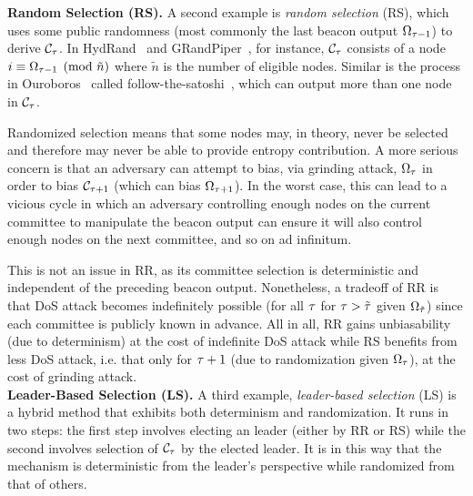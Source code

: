\noindent\textbf{Random Selection (RS).} A second example is \textit{random selection} (RS), which uses some public randomness (most commonly the last beacon output $\Omega_{\tau - 1}$) to derive $\mathcal{C}_\tau$.
In HydRand~\cite{schindler2020hydrand} and GRandPiper~\cite{bhat2020randpiper}, for instance, $\mathcal{C}_\tau$ consists of a node $i \equiv \Omega_{\tau - 1} \pmod{\tilde{n}}$ where $\tilde{n}$ is the number of eligible nodes. Similar is the process in Ouroboros~\cite{kiayias2017ouroboros} called follow-the-satoshi~\cite{bentov2014proof,kiayias2017ouroboros}, which can output more than one node in $\mathcal{C}_\tau$.

Randomized selection means that some nodes may, in theory, never be selected and therefore may never be able to provide entropy contribution. A more serious concern is that an adversary can attempt to bias, via grinding attack, $\Omega_\tau$ in order to bias $\mathcal{C}_{\tau + 1}$ (which can bias $\Omega_{\tau + 1}$). In the worst case, this can lead to a vicious cycle in which an adversary controlling enough nodes on the current committee to manipulate the beacon output can ensure it will also control enough nodes on the next committee, and so on ad infinitum.

This is not an issue in RR, as its committee selection is deterministic and independent of the preceding beacon output. Nonetheless, a tradeoff of RR is that DoS attack becomes indefinitely possible (for all \epochs $\tau$ for $\tau > \tilde{\tau}$ given $\Omega_{\tilde{\tau}}$) since each committee is publicly known in advance. All in all, RR gains unbiasability (due to determinism) at the cost of indefinite DoS attack while RS benefits from less DoS attack, i.e. that only for \epoch $\tau + 1$ (due to randomization given $\Omega_\tau$), at the cost of grinding attack.\\

\noindent\textbf{Leader-Based Selection (LS).} A third example, \textit{leader-based selection} (LS) is a hybrid method that exhibits both determinism and randomization. It runs in two steps: the first step involves electing an \epoch leader (either by RR or RS) while the second involves selection of $\mathcal{C}_\tau$ by the elected leader. It is in this way that the mechanism is deterministic from the leader's perspective while randomized from that of others.

